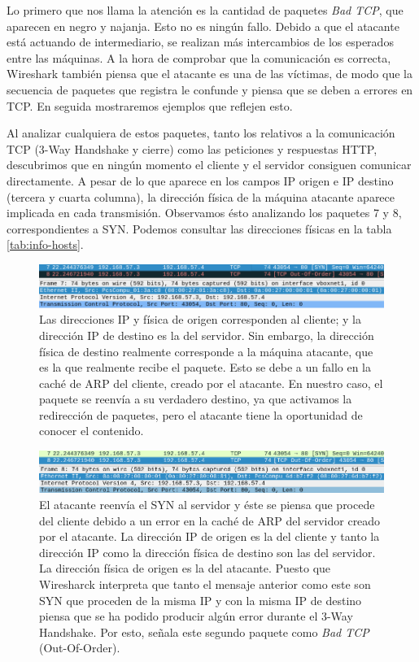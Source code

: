 \documentclass[11pt]{article}
\begin{document}
Lo primero que nos llama la atención es la cantidad de paquetes \emph{Bad TCP}, que aparecen en negro y najanja. Esto
no es ningún fallo. Debido a que el atacante está actuando de intermediario, se realizan más intercambios de los esperados
entre las máquinas. A la hora de comprobar que la comunicación es correcta, Wireshark también piensa que el atacante es
una de las víctimas, de modo que la secuencia de paquetes que registra le confunde y piensa que se deben a errores en TCP. En 
seguida mostraremos ejemplos que reflejen esto.

Al analizar cualquiera de estos paquetes, tanto los relativos a la comunicación TCP (3-Way Handshake y cierre) como las peticiones y
respuestas HTTP, descubrimos que en ningún momento el cliente y el servidor consiguen comunicar directamente. A pesar de lo que aparece
en los campos IP origen e IP destino (tercera y cuarta columna), la dirección física de la máquina atacante aparece implicada
en cada transmisión. Observamos ésto analizando los paquetes 7 y 8, correspondientes a SYN. Podemos consultar las direcciones físicas en
la tabla \ref{tab:info-hosts}.

\begin{figure}[H]
	\centering
	\includegraphics[width=160mm]{images/atack1/syn-client-atacker}
	\caption{Las direcciones IP y física de origen corresponden al cliente; y la dirección IP de destino es la del servidor. Sin embargo,
	la dirección física de destino realmente corresponde a la máquina atacante, que es la que realmente recibe el paquete. Esto se debe
	a un fallo en la caché de ARP del cliente, creado por el atacante. En nuestro caso, el paquete se reenvía a su verdadero destino,
	ya que activamos la redirección de paquetes, pero el atacante tiene la oportunidad de conocer el contenido.}
	\label{fig:syn-client-atacker}
\end{figure}

\begin{figure}[H]
	\centering
	\includegraphics[width=160mm]{images/atack1/syn-atacker-server}
	\caption{El atacante reenvía el SYN al servidor y éste se piensa que procede del cliente debido a un error en la caché de ARP del servidor
		creado por el atacante. La dirección IP de origen es la del cliente y tanto la dirección IP como la dirección física de destino son las del servidor. La dirección física de origen es la del atacante. Puesto que Wiresharck interpreta que tanto el mensaje anterior como este son SYN que proceden de la misma IP y con la misma IP de destino piensa que se ha podido producir algún error durante el 3-Way Handshake. Por esto, señala este segundo paquete como \textit{Bad TCP} (Out-Of-Order).}
	\label{fig:syn-atacker-server}
\end{figure}
\end{document}
